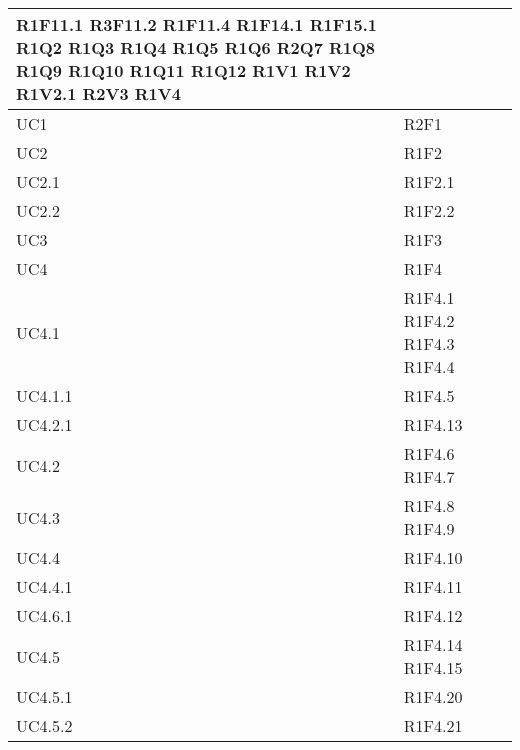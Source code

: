 \begin{center}
\begin{longtable}{|p{44mm}|p{22mm}|}
	R1F11.1\newline
	R3F11.2\newline
	R1F11.4\newline
	R1F14.1\newline
	R1F15.1	\newline
	R1Q2  \newline
	R1Q3  \newline
	R1Q4   \newline	
	R1Q5  \newline
	R1Q6  \newline
	R2Q7  \newline
	R1Q8  \newline
	R1Q9  \newline
	R1Q10   \newline	
	R1Q11 \newline
	R1Q12 \newline
	R1V1 \newline
	R1V2 \newline
	R1V2.1\newline
	R2V3  \newline
	R1V4   
\\
\hline
UC1 & R2F1  \\
\hline
UC2 & R1F2  \\
\hline
UC2.1 & R1F2.1  \\
\hline
UC2.2 & R1F2.2  \\
\hline
UC3 & R1F3  \\
\hline
UC4& R1F4 \\
\hline
UC4.1& 
	R1F4.1  \newline
	R1F4.2 \newline
	R1F4.3 \newline
	R1F4.4 
 \\
\hline
UC4.1.1& R1F4.5 \\
\hline
UC4.2.1& R1F4.13\\
\hline
UC4.2& 
	R1F4.6  \newline
	R1F4.7 
   \\
\hline
UC4.3& 
	R1F4.8  \newline
	R1F4.9 
   \\
\hline
UC4.4& R1F4.10\\
\hline
UC4.4.1& R1F4.11 \\
\hline
UC4.6.1& R1F4.12 \\
\hline

UC4.5&  
R1F4.14  \newline
R1F4.15  	
  \\ \hline
UC4.5.1 & R1F4.20  \\
\hline
UC4.5.2 & R1F4.21 \\
\hline


\end{longtable}
\end{center}
